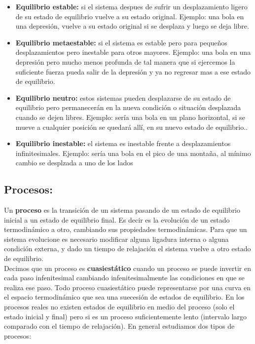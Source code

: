 \documentclass[12pt,a4paper]{article}
\begin{document}
\begin{itemize}

\item \textbf{Equilibrio estable:} si el sistema despues de sufrir un desplazamiento ligero de su estado de equilibrio vuelve a su estado original. Ejemplo: una bola en una depresión, vuelve a su estado original si se desplaza y luego se deja libre.

\item \textbf{Equilibrio metaestable:} si el sistema es estable pero para pequeños desplazamientos pero inestable para otros mayores. Ejemplo: una bola en una depresión pero mucho menos profunda de tal manera que si ejercemos la suficiente fuerza pueda salir de la depresión y ya no regresar mas a ese estado de equilibrio.

\item \textbf{Equilibrio neutro:} estos sistemas pueden desplazarse de su estado de equilibrio pero permanecerán en la nueva condición o situación desplazada cuando se dejen libres. Ejemplo: sería una bola en un plano horizontal, si se mueve a cualquier posición se quedará allí, en su nuevo estado de equilibrio..

\item \textbf{Equilibrio inestable:} el sistema es inestable frente a desplazamientos infinitesimales. Ejemplo: sería una bola en el pico de una montaña, al mínimo cambio se desplzada a uno de los lados
\end{itemize}

\subsection{Procesos:}
Un \textbf{proceso} es la transición de un sistema pasando de un estado de equilibrio inicial a un estado de equilibrio final. Es decir es la evolución de un estado termodinámico a otro, cambiando sus propiedades termodinámicas. Para que un sistema evolucione es necesario modificar alguna ligadura interna o alguna condición externa, y dado un tiempo de relajación el sistema vuelve a otro estado de equilibrio. \\

Decimos que un proceso es \textbf{cuasiestático} cuando un proceso se puede invertir en cada paso infenitesimal cambiando infenitesimalmente las condiciones en que se realiza ese paso. Todo proceso cuasiestático puede representarse por una curva en el espacio termodinámico que sea una suecesión de estados de equilibrio. En los procesos reales no existen estados de equilibrio en medio del proceso (solo el estado inicial y final) pero si es un proceso suficientemente lento (intervalo largo comparado con el tiempo de relajación). En general estudiamos dos tipos de procesos:
\end{document}
